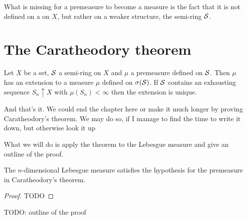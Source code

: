 What is missing for a premeasure to become a measure is the fact that it is not defined on a \siga on $X$, but rather on a weaker structure, the semi-ring $\mathcal{S}$.

\section{The Caratheodory theorem}

\begin{thm}[Caratheodory]
	\label{thm:caratheodory}
	Let $X$ be a set, $\mathcal{S}$ a semi-ring on $X$ and $\mu$ a premeasure defined on $\mathcal{S}$. Then $\mu$ has an extension to a measure $\mu$ defined on $\sigma(\mathcal{S})$. If $\mathcal{S}$ contains an exhausting sequence $S_n \uparrow X$ with $\mu(S_n) < \infty$ then the extension is unique.
\end{thm}

And that's it. We could end the chapter here or make it much longer by proving Caratheodory's theorem. We may do so, if I manage to find the time to write it down, but otherwise look it up \cite[p. 41]{schilling2017}

What we will do is apply the theorem to the Lebesgue measure and give an outline of the proof.

\begin{remark}
	The $n$-dimensional Lebesgue measure satisfies the hypothesis for the premeasure in Caratheodory's theorem.
\end{remark}

\begin{proof}
	TODO
\end{proof}

TODO: outline of the proof